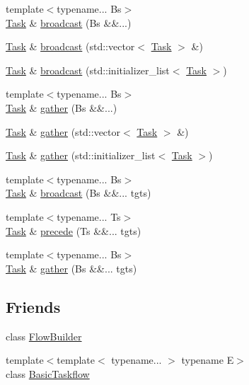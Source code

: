 \begin{DoxyCompactItemize}
\item 
{\footnotesize template$<$typename... Bs$>$ }\\\hyperlink{classtf_1_1Task}{Task} \& \hyperlink{classtf_1_1Task_a93623de40d7be63008959a0b4dc27e0c}{broadcast} (Bs \&\&...)
\item 
\hyperlink{classtf_1_1Task}{Task} \& \hyperlink{classtf_1_1Task_a533af3422ab292aaa80d55fb2870549d}{broadcast} (std\+::vector$<$ \hyperlink{classtf_1_1Task}{Task} $>$ \&)
\item 
\hyperlink{classtf_1_1Task}{Task} \& \hyperlink{classtf_1_1Task_af53724f41d3b6c7221645bd093d68189}{broadcast} (std\+::initializer\+\_\+list$<$ \hyperlink{classtf_1_1Task}{Task} $>$)
\item 
{\footnotesize template$<$typename... Bs$>$ }\\\hyperlink{classtf_1_1Task}{Task} \& \hyperlink{classtf_1_1Task_aadd7845ba7867a87f1f2ac3f6d7ae569}{gather} (Bs \&\&...)
\item 
\hyperlink{classtf_1_1Task}{Task} \& \hyperlink{classtf_1_1Task_a915feb8a514095f1b98afb857e53e539}{gather} (std\+::vector$<$ \hyperlink{classtf_1_1Task}{Task} $>$ \&)
\item 
\hyperlink{classtf_1_1Task}{Task} \& \hyperlink{classtf_1_1Task_a57a5b65d54bed7e6319500239e35dc19}{gather} (std\+::initializer\+\_\+list$<$ \hyperlink{classtf_1_1Task}{Task} $>$)
\item 
{\footnotesize template$<$typename... Bs$>$ }\\\hyperlink{classtf_1_1Task}{Task} \& \hyperlink{classtf_1_1Task_a5ac7ac1f8f16dc4ec821fa19e36e25b1}{broadcast} (Bs \&\&... tgts)
\item 
{\footnotesize template$<$typename... Ts$>$ }\\\hyperlink{classtf_1_1Task}{Task} \& \hyperlink{classtf_1_1Task_ac8055e2fc0d0a578be87522fff496b55}{precede} (Ts \&\&... tgts)
\item 
{\footnotesize template$<$typename... Bs$>$ }\\\hyperlink{classtf_1_1Task}{Task} \& \hyperlink{classtf_1_1Task_affdecfa1c16d46eb7d8eec1b63e5eed9}{gather} (Bs \&\&... tgts)
\end{DoxyCompactItemize}
\subsection*{Friends}
\begin{DoxyCompactItemize}
\item 
class \hyperlink{classtf_1_1Task_a61184f9bd9c801d0a5eccecfdbddc641}{Flow\+Builder}
\item 
{\footnotesize template$<$template$<$ typename... $>$ typename E$>$ }\\class \hyperlink{classtf_1_1Task_ab3ad8c5c7ed22c3fbd8a41b84db75083}{Basic\+Taskflow}
\end{DoxyCompactItemize}


